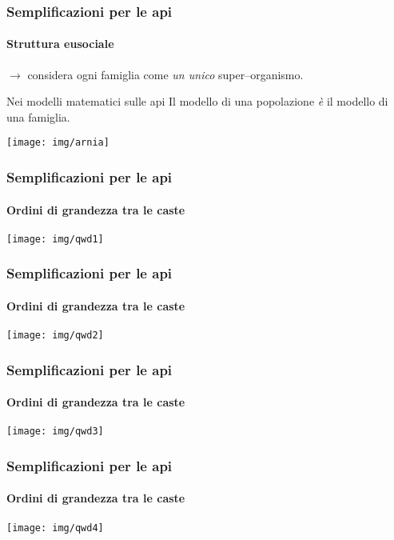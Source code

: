 \documentclass[]{beamer}
\begin{document}
\begin{frame}
    \frametitle{Semplificazioni per le api}
    \framesubtitle{Struttura eusociale}

    $\rightarrow$ considera ogni famiglia come \emph{un unico} super--organismo.

    \pause
    \begin{alertblock}{Nei modelli matematici sulle api}
        \centering
        Il modello di una popolazione \emph{è} il modello di una famiglia.

        \texttt{[image: img/arnia]}
    \end{alertblock}


\end{frame}

\begin{frame}
    \frametitle{Semplificazioni per le api}
    \framesubtitle{Ordini di grandezza tra le caste}

    \begin{center}
        \texttt{[image: img/qwd1]}
    \end{center}
\end{frame}

\begin{frame}
    \frametitle{Semplificazioni per le api}
    \framesubtitle{Ordini di grandezza tra le caste}

    \begin{center}
        \texttt{[image: img/qwd2]}
    \end{center}
\end{frame}

\begin{frame}
    \frametitle{Semplificazioni per le api}
    \framesubtitle{Ordini di grandezza tra le caste}

    \begin{center}
        \texttt{[image: img/qwd3]}
    \end{center}
\end{frame}

\begin{frame}
    \frametitle{Semplificazioni per le api}
    \framesubtitle{Ordini di grandezza tra le caste}

    \begin{center}
        \texttt{[image: img/qwd4]}
    \end{center}
\end{frame}
\end{document}
